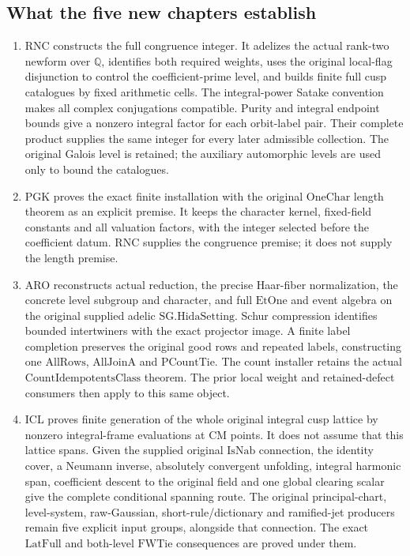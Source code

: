 \subsection{What the five new chapters establish}

\begin{enumerate}
\item RNC constructs the full congruence integer. It adelizes the actual
rank-two newform over \(\mathbb Q\), identifies both required weights,
uses the original local-flag disjunction to control the coefficient-prime
level, and builds finite full cusp catalogues by fixed arithmetic cells.
The integral-power Satake convention makes all complex conjugations
compatible. Purity and integral endpoint bounds give a nonzero integral
factor for each orbit-label pair. Their complete product supplies the
same integer for every later admissible collection. The original
Galois level is retained; the auxiliary automorphic levels are used
only to bound the catalogues.

\item PGK proves the exact finite installation with the original
\(\mathrm{OneChar}\) length theorem as an explicit premise. It keeps
the character kernel, fixed-field constants and all valuation factors,
with the integer selected before the coefficient datum. RNC supplies
the congruence premise; it does not supply the length premise.

\item ARO reconstructs actual reduction, the precise Haar-fiber
normalization, the concrete level subgroup and character, and full
\(\mathrm{EtOne}\) and event algebra on the original supplied adelic
\(\mathrm{SG.HidaSetting}\). Schur compression identifies bounded
intertwiners with the exact projector image. A finite label completion
preserves the original good rows and repeated labels, constructing
one \(\mathrm{AllRows}\), \(\mathrm{AllJoinA}\) and
\(\mathrm{PCountTie}\). The count installer retains the actual
\(\mathrm{CountIdempotentsClass}\) theorem. The prior local weight
and retained-defect consumers then apply to this same object.

\item ICL proves finite generation of the whole original integral cusp
lattice by nonzero integral-frame evaluations at CM points. It does
not assume that this lattice spans. Given the supplied original \(\mathrm{IsNab}\) connection, the
identity cover, a Neumann
inverse, absolutely convergent unfolding, integral harmonic span,
coefficient descent to the original field and one global clearing
scalar give the complete conditional spanning route. The original
principal-chart, level-system, raw-Gaussian, short-rule/dictionary and
ramified-jet producers remain five explicit input groups, alongside that connection. The exact
\(\mathrm{LatFull}\) and both-level \(\mathrm{FWTie}\) consequences
are proved under them.


\end{enumerate}
